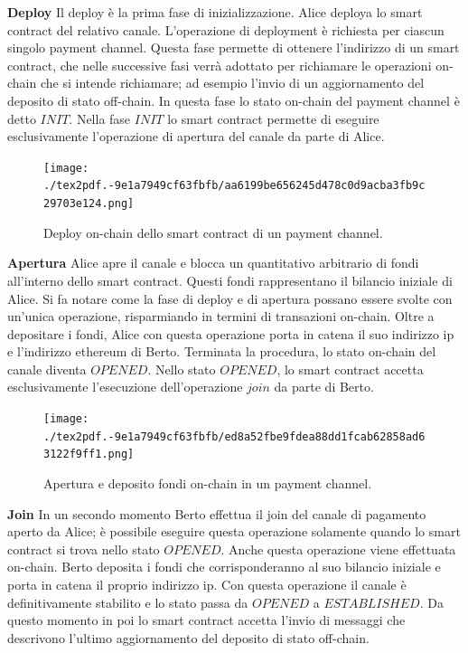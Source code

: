 \documentclass[12pt,italian,]{book}
\begin{document}
\textbf{\textbf{Deploy}} Il deploy è la prima fase di inizializzazione. Alice deploya lo smart contract del relativo canale. L'operazione di deployment è richiesta per ciascun singolo payment channel. Questa fase permette di ottenere l'indirizzo di un smart contract, che nelle successive fasi verrà adottato per richiamare le operazioni on-chain che si intende richiamare; ad esempio l'invio di un aggiornamento del deposito di stato off-chain. In questa fase lo stato on-chain del payment channel è detto \(INIT\). Nella fase \(INIT\) lo smart contract permette di eseguire esclusivamente l'operazione di apertura del canale da parte di Alice.

\begin{figure}
\centering
\texttt{[image: ./tex2pdf.-9e1a7949cf63fbfb/aa6199be656245d478c0d9acba3fb9c29703e124.png]}
\caption{Deploy on-chain dello smart contract di un payment channel.}
\end{figure}

\textbf{\textbf{Apertura}} Alice apre il canale e blocca un quantitativo arbitrario di fondi all'interno dello smart contract. Questi fondi rappresentano il bilancio iniziale di Alice. Si fa notare come la fase di deploy e di apertura possano essere svolte con un'unica operazione, risparmiando in termini di transazioni on-chain. Oltre a depositare i fondi, Alice con questa operazione porta in catena il suo indirizzo ip e l'indirizzo ethereum di Berto. Terminata la procedura, lo stato on-chain del canale diventa \(OPENED\). Nello stato \(OPENED\), lo smart contract accetta esclusivamente l'esecuzione dell'operazione \(join\) da parte di Berto.

\begin{figure}
\centering
\texttt{[image: ./tex2pdf.-9e1a7949cf63fbfb/ed8a52fbe9fdea88dd1fcab62858ad63122f9ff1.png]}
\caption{Apertura e deposito fondi on-chain in un payment channel.}
\end{figure}

\textbf{\textbf{Join}} In un secondo momento Berto effettua il join del canale di pagamento aperto da Alice; è possibile eseguire questa operazione solamente quando lo smart contract si trova nello stato \(OPENED\). Anche questa operazione viene effettuata on-chain. Berto deposita i fondi che corrisponderanno al suo bilancio iniziale e porta in catena il proprio indirizzo ip. Con questa operazione il canale è definitivamente stabilito e lo stato passa da \(OPENED\) a \(ESTABLISHED\). Da questo momento in poi lo smart contract accetta l'invio di messaggi che descrivono l'ultimo aggiornamento del deposito di stato off-chain.
\end{document}
